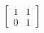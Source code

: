 \documentclass[preview]{standalone}
\begin{document}
\begin{align*}
\begin{bmatrix} 1 & 1 \\ 0 & 1 \end{bmatrix}
\end{align*}
\end{document}

